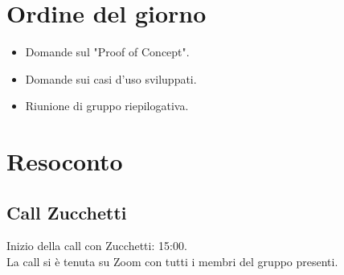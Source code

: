 \section{Ordine del giorno}

\begin{itemize}
	\item Domande sul "Proof of Concept".
	\item Domande sui casi d'uso sviluppati.
	\item Riunione di gruppo riepilogativa.
\end{itemize}

\section{Resoconto}
\label{sec:Resoconto}

\subsection{Call Zucchetti}
\noindent 
Inizio della call con Zucchetti: 15:00. \\
\noindent La call si è tenuta su Zoom con tutti i membri del gruppo presenti.

